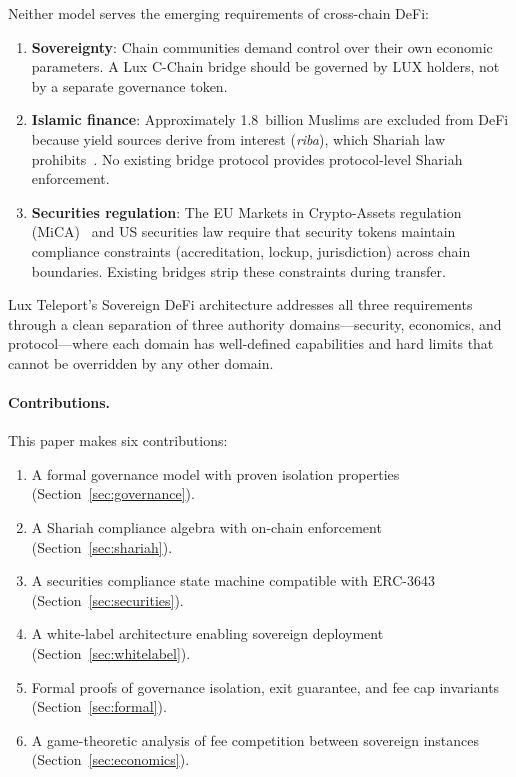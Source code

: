 \documentclass[11pt,twocolumn]{article}
\theoremstyle{definition}
\begin{document}
Neither model serves the emerging requirements of cross-chain DeFi:

\begin{enumerate}[nosep]
  \item \textbf{Sovereignty}: Chain communities demand control over their own economic parameters. A Lux C-Chain bridge should be governed by LUX holders, not by a separate governance token.
  \item \textbf{Islamic finance}: Approximately 1.8~billion Muslims are excluded from DeFi because yield sources derive from interest (\emph{riba}), which Shariah law prohibits~\cite{usmani2002}. No existing bridge protocol provides protocol-level Shariah enforcement.
  \item \textbf{Securities regulation}: The EU Markets in Crypto-Assets regulation (MiCA)~\cite{mica2023} and US securities law require that security tokens maintain compliance constraints (accreditation, lockup, jurisdiction) across chain boundaries. Existing bridges strip these constraints during transfer.
\end{enumerate}

Lux Teleport's Sovereign DeFi architecture addresses all three requirements through a clean separation of three authority domains---security, economics, and protocol---where each domain has well-defined capabilities and hard limits that cannot be overridden by any other domain.

\paragraph{Contributions.} This paper makes six contributions:
\begin{enumerate}[nosep]
  \item A formal governance model with proven isolation properties (Section~\ref{sec:governance}).
  \item A Shariah compliance algebra with on-chain enforcement (Section~\ref{sec:shariah}).
  \item A securities compliance state machine compatible with ERC-3643~\cite{erc3643} (Section~\ref{sec:securities}).
  \item A white-label architecture enabling sovereign deployment (Section~\ref{sec:whitelabel}).
  \item Formal proofs of governance isolation, exit guarantee, and fee cap invariants (Section~\ref{sec:formal}).
  \item A game-theoretic analysis of fee competition between sovereign instances (Section~\ref{sec:economics}).
\end{enumerate}
\end{document}
